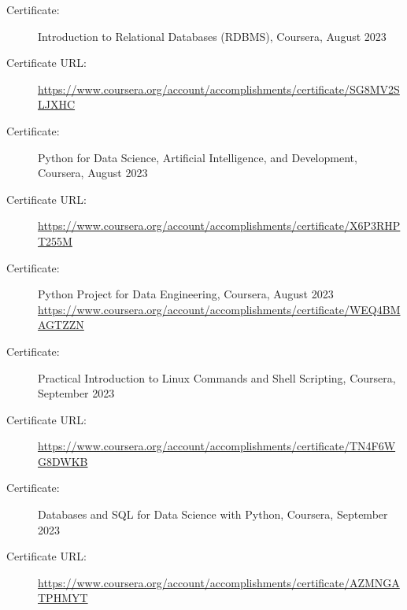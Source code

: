 \documentclass[a4paper,10pt]{article}
\begin{document}
\vspace{1pt} %

\begin{description}
    \item[Certificate:] Introduction to Relational Databases (RDBMS), Coursera, August 2023
    \item[Certificate URL:] \url{https://www.coursera.org/account/accomplishments/certificate/SG8MV2SLJXHC}
\end{description}

\vspace{1pt} %

\begin{description}
    \item[Certificate:] Python for Data Science, Artificial Intelligence, and Development, Coursera, August 2023
    \item[Certificate URL:] \url{https://www.coursera.org/account/accomplishments/certificate/X6P3RHPT255M}
\end{description}

\vspace{1pt} %

\begin{description}
    \item[Certificate:] Python Project for Data Engineering, Coursera, August 2023
    \url{https://www.coursera.org/account/accomplishments/certificate/WEQ4BMAGTZZN}
\end{description}

\vspace{1pt} %

\begin{description}
    \item[Certificate:] Practical Introduction to Linux Commands and Shell Scripting, Coursera, September 2023
    \item[Certificate URL:] \url{https://www.coursera.org/account/accomplishments/certificate/TN4F6WG8DWKB}
\end{description}

\vspace{1pt} %

\begin{description}
    \item[Certificate:] Databases and SQL for Data Science with Python, Coursera, September 2023
    \item[Certificate URL:] \url{https://www.coursera.org/account/accomplishments/certificate/AZMNGATPHMYT}
\end{description}
\end{document}
